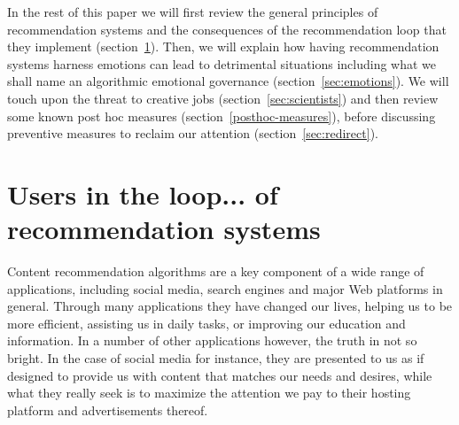 \documentclass[10pt]{article}
\begin{document}
In the rest of this paper we will first review the general principles of recommendation systems and the consequences of the recommendation loop that they implement (section~\ref{sec:recommenders}). Then, we will explain how having recommendation systems harness emotions can lead to detrimental situations including what we shall name an algorithmic emotional governance (section~\ref{sec:emotions}). We will touch upon the threat to creative jobs (section~\ref{sec:scientists}) and then review some known post hoc measures (section~\ref{posthoc-measures}), before discussing preventive measures to reclaim our attention (section~\ref{sec:redirect}).


\section{Users in the loop... of recommendation systems}\label{sec:recommenders}

Content recommendation algorithms are a key component of a wide range of applications, including social media, search engines and major Web platforms in general.
Through many applications they have changed our lives, helping us to be more efficient, assisting us in daily tasks, or improving our education and information.
In a number of other applications however, the truth in not so bright.
In the case of social media for instance, they are presented to us as if designed to provide us with content that matches our needs and desires, while what they really seek is to maximize the attention we pay to their hosting platform and advertisements thereof. 
\end{document}
